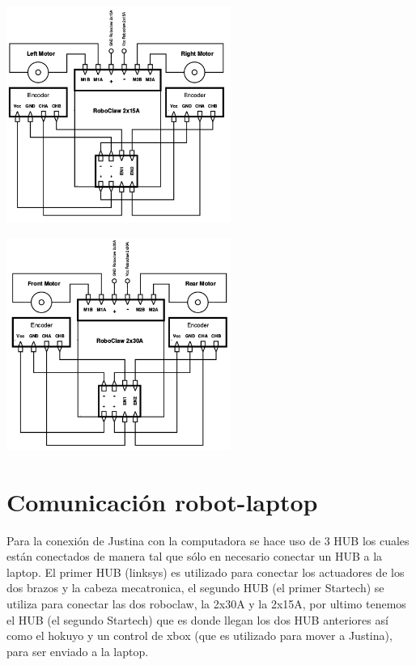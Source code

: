 \documentclass[user_manual.tex]{subfiles}
\begin{document}
\begin{center}
\includegraphics[width=0.55\textwidth]{Figures/Hardware/Esquematicos/Roboclaw_1.png}
\label{fig:Hardware:Partes:Diagrama:Esquematico:Roboclaw:1}
\end{center}

\begin{center}
\includegraphics[width=0.55\textwidth]{Figures/Hardware/Esquematicos/Roboclaw_2.png}
\label{fig:Hardware:Partes:Diagrama:Esquematico:Roboclaw:2}
\end{center}

\section{Comunicación robot-laptop}
Para la conexión de Justina con la computadora se hace uso de 3 HUB los cuales están conectados de manera tal que sólo en necesario conectar
un HUB a la laptop. El primer HUB (linksys) es utilizado para conectar los actuadores de los dos brazos y la cabeza mecatronica,
el segundo HUB (el primer Startech) se utiliza para conectar las dos roboclaw, la 2x30A y la 2x15A, por ultimo tenemos el HUB (el segundo 
Startech) que es donde llegan los dos HUB anteriores así como el hokuyo y un control de xbox (que es utilizado para mover a Justina), para
ser enviado a la laptop.\\
\\
\end{document}
